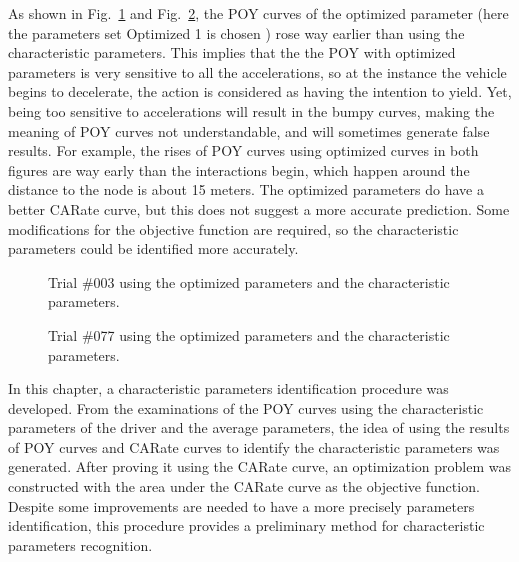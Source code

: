 As shown in Fig.~\ref{fig:trial003OptimChara} and Fig.~\ref{fig:trial077OptimChara}, the POY curves of the optimized parameter (here the parameters set Optimized 1 is chosen ) rose way earlier than using the characteristic parameters. This implies that the the POY with optimized parameters is very sensitive to all the accelerations, so at the instance the vehicle begins to decelerate, the action is considered as having the intention to yield. Yet, being too sensitive to accelerations will result in the bumpy curves, making the meaning of POY curves not understandable, and will sometimes generate false results. For example, the rises of POY curves using optimized curves in both figures are way early than the interactions begin, which happen around the distance to the node is about 15 meters. The optimized parameters do have a better CARate curve, but this does not suggest a more accurate prediction. Some modifications for the objective function are required, so the characteristic parameters could be identified more accurately.


\begin{figure}[htbp!]
\begin{center}
\end{center}
\caption{Trial \#003 using the optimized parameters and the characteristic parameters.}
\label{fig:trial003OptimChara} 
\end{figure}

\begin{figure}[htbp!]
\begin{center}
\end{center}
\caption{Trial \#077 using the optimized parameters and the characteristic parameters.}
\label{fig:trial077OptimChara} 
\end{figure}


In this chapter, a characteristic parameters identification procedure was developed. From the examinations of the POY curves using the characteristic parameters of the driver and the average parameters, the idea of using the results of POY curves and CARate curves to identify the characteristic parameters was generated. After proving it using the CARate curve, an optimization problem was constructed with the area under the CARate curve as the objective function. Despite some improvements are needed to have a more precisely parameters identification, this procedure provides a preliminary method for characteristic parameters recognition.